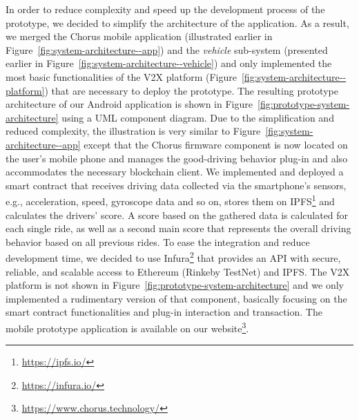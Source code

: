 \documentclass{llncs}
\begin{document}
{			In order to reduce complexity and speed up the development process of the prototype, we decided to simplify the architecture of the application. As a result, we merged the Chorus mobile application (illustrated earlier in Figure~\ref{fig:system-architecture--app}) and the \textit{vehicle} sub-system (presented earlier in Figure~\ref{fig:system-architecture--vehicle}) and only implemented the most basic functionalities of the V2X platform (Figure~\ref{fig:system-architecture--platform}) that are necessary to deploy the prototype. The resulting prototype architecture of our Android application is shown in Figure~\ref{fig:prototype-system-architecture} using a UML component diagram. Due to the simplification and reduced complexity, the illustration is very similar to Figure~\ref{fig:system-architecture--app} except that the Chorus firmware component is now located on the user's mobile phone and manages the good-driving behavior plug-in and also accommodates the necessary blockchain client. We implemented and deployed a smart contract that receives driving data collected via the smartphone's sensors, e.g., acceleration, speed, gyroscope data and so on, stores them on IPFS\footnote{\url{https://ipfs.io/}} and calculates the drivers' score. A score based on the gathered data is calculated for each single ride, as well as a second main score that represents the overall driving behavior based on all previous rides. To ease the integration and reduce development time, we decided to use Infura\footnote{\url{https://infura.io/}} that provides an API with secure, reliable, and scalable access to Ethereum (Rinkeby TestNet) and IPFS. The V2X platform is not shown in Figure~\ref{fig:prototype-system-architecture} and we only implemented a rudimentary version of that component, basically focusing on the smart contract functionalities and plug-in interaction and transaction. The mobile prototype application is available on our website\footnote{\url{https://www.chorus.technology/}}. 

}
\end{document}
